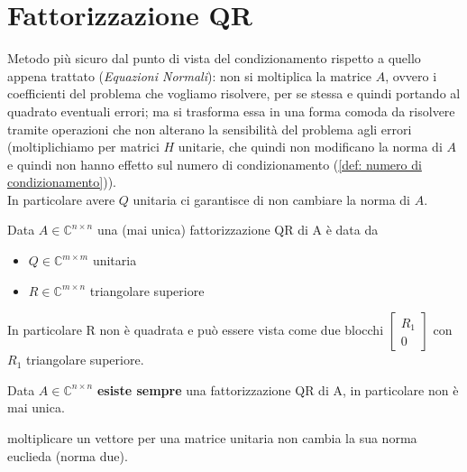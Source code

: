 \documentclass[12pt,a4paper,]{report}
\begin{document}
\section{Fattorizzazione QR}
Metodo più sicuro dal punto di vista del condizionamento rispetto a quello appena trattato (\textit{Equazioni Normali}): non si moltiplica la matrice $A$, ovvero i coefficienti del problema che vogliamo risolvere, per se stessa e quindi portando al quadrato eventuali errori; ma si trasforma essa in una forma comoda da risolvere tramite operazioni che non alterano la sensibilità del problema agli errori (moltiplichiamo per matrici $H$ unitarie, che quindi non modificano la norma di $A$ e quindi non hanno effetto sul numero di condizionamento (\autoref{def: numero di condizionamento})).\\
In particolare avere $Q$ unitaria ci garantisce di non cambiare la norma di $A$.
\begin{definizione}
    [Fattorizzazione QR]
    Data $A\in \mathbb{C}^{n\times n}$ una (mai unica) fattorizzazione QR di A è data da 
    \begin{itemize}
        \item $Q\in \mathbb{C}^{m\times m}$ unitaria
        \item $R\in \mathbb{C}^{m\times n}$ triangolare superiore
    \end{itemize}
    In particolare R non è quadrata e può essere vista come due blocchi 
    $
    \left[
    \begin{matrix}
        R_1 \\ 
        0
    \end{matrix}
    \right]
    $
    con $R_1$ triangolare superiore.
\end{definizione}
\begin{teorema}
    Data $A\in \mathbb{C}^{n\times n}$ \textbf{esiste sempre} una fattorizzazione QR di A, in particolare non è mai unica.
\end{teorema}
\begin{nota}
    moltiplicare un vettore per una matrice unitaria non cambia la sua norma euclieda (norma due).
\end{nota}
\end{document}
